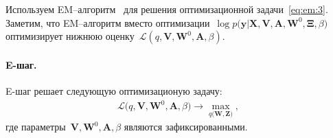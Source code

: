 \documentclass[12pt, twoside]{article}
\numberwithin{equation}{section}
\begin{document}
Используем EM--алгоритм~\cite{Dempster1977, bishop2006} для решения оптимизационной задачи~\eqref{eq:em:3}. Заметим, что EM--алгоритм вместо оптимизации~$\log p\bigr(\mathbf{y}|\mathbf{X}, \mathbf{V}, \textbf{A}, \textbf{W}^{0}, \bm{\Xi}, \beta\bigr)$ оптимизирует нижнюю оценку~$\mathcal{L}\left(q, \textbf{V}, \textbf{W}^{0}, \textbf{A}, \beta\right)$.


\paragraph{E-шаг.} E-шаг решает следующую оптимизационую задачу:
\[
\label{eq:em:new:3}
\begin{aligned}
\mathcal{L}\bigr(q, \textbf{V}, \textbf{W}^{0}, \textbf{A}, \beta\bigr) \to \max_{q\bigr(\textbf{W}, \textbf{Z}\bigr)},
\end{aligned}
\]
где параметры~$\textbf{V}, \textbf{W}^{0}, \textbf{A}, \beta$ являются зафиксированными.
\end{document}
